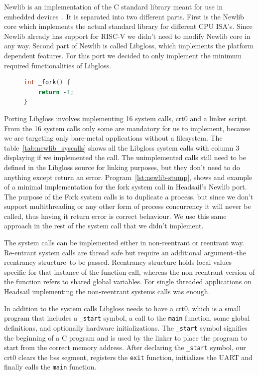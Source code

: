 \documentclass[12pt,a4paper,english
]{tunithesis}
\begin{document}
Newlib is an implementation of the C standard library meant for use in embedded devices~\parencite{newlib}. It is separated into two different parts. First is the Newlib core which implements the actual standard library for different CPU ISA's. Since Newlib already has support for RISC-V we didn't need to modify Newlib core in any way. Second part of Newlib is called Libgloss, which implements the platform dependent features. For this port we decided to only implement the minimum required functionalities of Libgloss.

\begin{figure}
\begin{lstlisting}[language=C, caption={Minimal implementation of the fork() syscall in Newlib Libgloss}, label={lst:newlib-stump}]
int _fork() {
    return -1;
}
\end{lstlisting}
\end{figure}

Porting Libgloss involves implementing 16 system calls, crt0 and a linker script. From the 16 system calls only some are mandatory for us to implement, because we are targeting only bare-metal applications without a filesystem. The table~\ref{tab:newlib_syscalls} shows all the Libgloss system calls with column 3 displaying if we implemented the call. The unimplemented calls still need to be defined in the Libgloss source for linking purposes, but they don't need to do anything except return an error. Program~\ref{lst:newlib-stump}, shows and example of a minimal implementation for the fork system call in Headsail's Newlib port. The purpose of the Fork system calls is to  duplicate a process, but since we don't support multithreading or any other form of process concurrency it will never be called, thus having it return error is correct behaviour. We use this same approach in the rest of the system call that we didn't implement.

The system calls can be implemented either in non-reentrant or reentrant way. Re-entrant system calls are thread safe but require an additional argument--the reentrancy structure--to be passed. Reentrancy structure holds local values specific for that instance of the function call, whereas the non-reentrant version of the function refers to shared global variables. For single threaded applications on Headsail implementing the non-reentrant systems calls was enough.~\parencite{bennett2010porting}

In addition to the system calls Libgloss needs to have a crt0, which is a small program that includes a \texttt{\_start} symbol, a call to the \texttt{main} function, some global definitions, and optionally hardware initializations. The \texttt{\_start} symbol signifies the beginning of a C program and is used by the linker to place the program to start from the correct memory address. After declaring the \texttt{\_start} symbol, our crt0 clears the bss segment, registers the \texttt{exit} function, initializes the UART and finally calls the \texttt{main} function.
\end{document}

